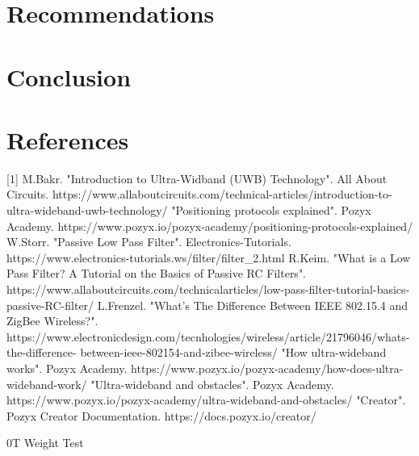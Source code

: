 \documentclass[12pt, a4paper]{article}
\begin{document}
\newpage
\section{Recommendations}


\newpage

\section{Conclusion}



\newpage

\section{References}
[1] M.Bakr. "Introduction to Ultra-Widband (UWB) Technology". All About Circuits.
https://www.allaboutcircuits.com/technical-articles/introduction-to-ultra-wideband-uwb-technology/
\newline
\newline
[2] "Positioning protocols explained". Pozyx Academy.
https://www.pozyx.io/pozyx-academy/positioning-protocols-explained/
\newline
\newline
[3] W.Storr. "Passive Low Pass Filter". Electronics-Tutorials.
https://www.electronics-tutorials.ws/filter/filter\_2.html
\newline
\newline
[4] R.Keim. "What is a Low Pass Filter? A Tutorial on the Basics of Passive RC Filters".
https://www.allaboutcircuits.com/technicalarticles/low-pass-filter-tutorial-basics-passive-RC-filter/
\newline
\newline
[5] L.Frenzel. "What's The Difference Between IEEE 802.15.4 and ZigBee Wireless?".
https://www.electronicdesign.com/tecnhologies/wireless/article/21796046/whats-the-difference-
between-ieee-802154-and-zibee-wireless/
\newline
\newline
[6] "How ultra-wideband works". Pozyx Academy.
https://www.pozyx.io/pozyx-academy/how-does-ultra-wideband-work/
\newline
\newline
[7] "Ultra-wideband and obstacles". Pozyx Academy.
https://www.pozyx.io/pozyx-academy/ultra-wideband-and-obstacles/
\newline
\newline
[8] "Creator". Pozyx Creator Documentation.
https://docs.pozyx.io/creator/




\begin{table}[htbp][H]
    \centering
    \caption{0T Weight Test}
    \label{tab:0_test}
\end{table}
\end{document}
